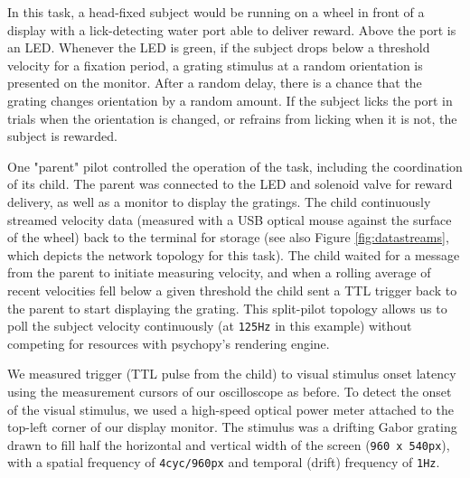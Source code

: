 \documentclass[nohyper, justified, notitlepage, marginals=raggedright,twoside=false,debug]{tufte-autopilot}
\begin{document}
In this task, a head-fixed subject would be running on a wheel in front of a display with a lick-detecting water port able to deliver reward. Above the port is an LED. Whenever the LED is green, if the subject drops below a threshold velocity for a fixation period, a grating stimulus at a random orientation is presented on the monitor. After a random delay, there is a chance that the grating changes orientation by a random amount. If the subject licks the port in trials when the orientation is changed, or refrains from licking when it is not, the subject is rewarded. 

One "parent" pilot controlled the operation of the task, including the coordination of its child. The parent was connected to the LED and solenoid valve for reward delivery, as well as a monitor to display the gratings. The child continuously streamed velocity data (measured with a USB optical mouse against the surface of the wheel) back to the terminal for storage (see also Figure \ref{fig:datastreams}, which depicts the network topology for this task). The child waited for a message from the parent to initiate measuring velocity, and when a rolling average of recent velocities fell below a given threshold the child sent a TTL trigger back to the parent to start displaying the grating. This split-pilot topology allows us to poll the subject velocity continuously (at \texttt{125Hz} in this example) without competing for resources with psychopy's rendering engine.

We measured trigger (TTL pulse from the child) to visual stimulus onset latency using the measurement cursors of our oscilloscope as before. To detect the onset of the visual stimulus, we used a high-speed optical power meter attached to the top-left corner of our display monitor. The stimulus was a drifting Gabor grating drawn to fill half the horizontal and vertical width of the screen (\texttt{960 x 540px}), with a spatial frequency of \texttt{4cyc/960px} and temporal (drift) frequency of \texttt{1Hz}.
\end{document}
